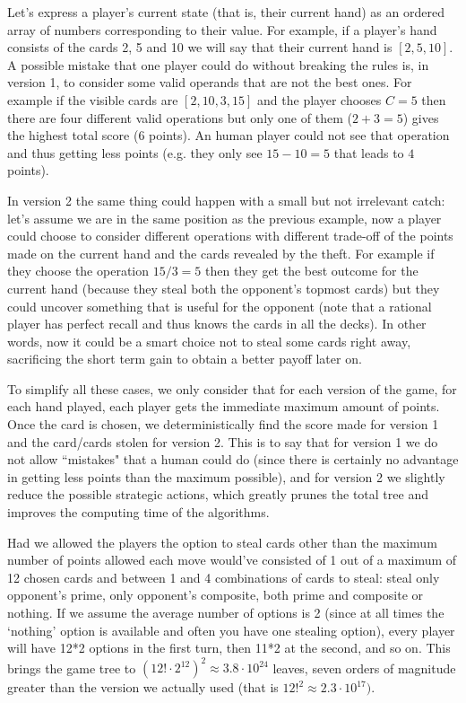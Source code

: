 \documentclass[conference]{IEEEtran}
\begin{document}
Let's express a player's current state (that is, their current hand) as an ordered array of numbers corresponding to their value. For example, if a player's hand consists of the cards 2, 5 and 10 we will say that their current hand is $[2, 5, 10]$.
A possible mistake that one player could do without breaking the rules is, in version 1, to consider some valid operands that are not the best ones. For example if the visible cards are $[2,10,3,15]$ and the player chooses $C=5$ then there are four different valid operations but only one of them ($2+3=5$) gives the highest total score ($6$ points). An human player could not see that operation and thus getting less points (e.g. they only see $15-10=5$ that leads to $4$ points).

In version 2 the same thing could happen with a small but not irrelevant catch: let's assume we are in the same position as the previous example, now a player could choose to consider different operations with different trade-off of the points made on the current hand and the cards revealed by the theft. For example if they choose the operation $15/3=5$ then they get the best outcome for the current hand (because they steal both the opponent's topmost cards) but they could uncover something that is useful for the opponent (note that a rational player has perfect recall and thus knows the cards in all the decks). In other words, now it could be a smart choice not to steal some cards right away, sacrificing the short term gain to obtain a better payoff later on. 

To simplify all these cases, we only consider that for each version of the game, for each hand played, each player gets the immediate maximum amount of points. Once the card is chosen, we deterministically find the score made for version 1 and the card/cards stolen for version 2. This is to say that for version 1 we do not allow ``mistakes" that a human could do (since there is certainly no advantage in getting less points than the maximum possible), and for version 2 we slightly reduce the possible strategic actions, which greatly prunes the total tree and improves the computing time of the algorithms.

Had we allowed the players the option to steal cards other than the maximum number of points allowed each move would've consisted of 1 out of a maximum of 12 chosen cards and between 1 and 4 combinations of cards to steal: steal only opponent's prime, only opponent's composite, both prime and composite or nothing. If we assume the average number of options is 2 (since at all times the `nothing' option is available and often you have one stealing option), every player will have 12*2 options in the first turn, then 11*2 at the second, and so on. This brings the game tree to $(12! \cdot 2^{12})^2 \approx 3.8 \cdot 10^{24}$ leaves, seven orders of magnitude greater than the version we actually used (that is $12!^2 \approx 2.3 \cdot 10^{17})$.
\end{document}
